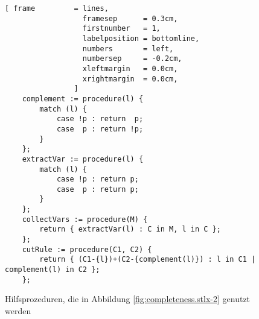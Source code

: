 \begin{figure}[!ht]
\centering
\begin{Verbatim}[ frame         = lines, 
                  framesep      = 0.3cm, 
                  firstnumber   = 1,
                  labelposition = bottomline,
                  numbers       = left,
                  numbersep     = -0.2cm,
                  xleftmargin   = 0.0cm,
                  xrightmargin  = 0.0cm,
                ]
    complement := procedure(l) {
        match (l) {
            case !p : return  p;
            case  p : return !p;
        }
    };
    extractVar := procedure(l) {
        match (l) {
            case !p : return p;
            case  p : return p;
        }
    };
    collectVars := procedure(M) {
        return { extractVar(l) : C in M, l in C };
    };
    cutRule := procedure(C1, C2) {
        return { (C1-{l})+(C2-{complement(l)}) : l in C1 | complement(l) in C2 };
    };
\end{Verbatim}
\vspace*{-0.3cm}
\caption{Hilfsprozeduren, die in Abbildung \ref{fig:completeness.stlx-2} genutzt werden}
\label{fig:completeness.stlx-1}
\end{figure}
\pagebreak

